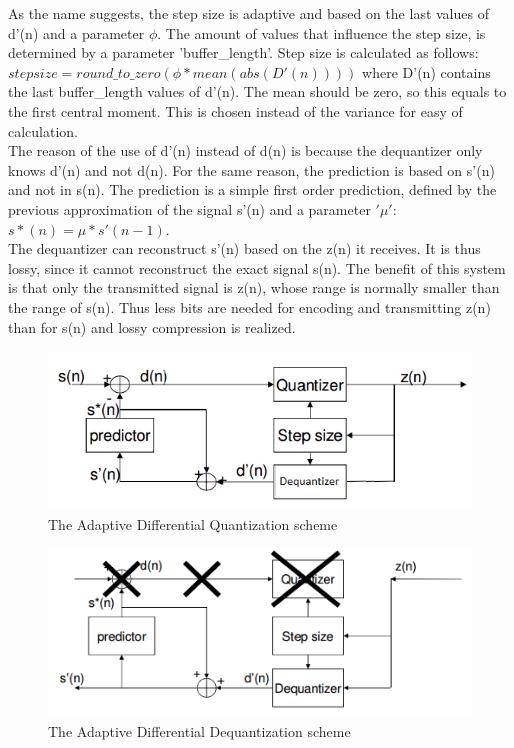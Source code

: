 \documentclass[a4paper]{article}
\begin{document}
As the name suggests, the step size is adaptive and based on the last values of d'(n) and a parameter $\phi$. The amount of values that influence the step size, is determined by a parameter 'buffer\_length'. Step size is calculated as follows:\\
$stepsize = round\_to\_zero(\phi*mean(abs(D'(n))))$
where D'(n) contains the last buffer\_length values of d'(n). The mean should be zero, so this equals to the first central moment. This is chosen instead of the variance for easy of calculation. \\
The reason of the use of d'(n) instead of d(n) is because the dequantizer only knows d'(n) and not d(n). For the same reason, the prediction is based on s'(n) and not in s(n). The prediction is a simple first order prediction, defined by the previous approximation of the signal s'(n) and a parameter $'\mu'$:\\
$s*(n) = \mu*s'(n-1)$.\\
The dequantizer can reconstruct s'(n) based on the z(n) it receives. It is thus lossy, since it cannot reconstruct the exact signal s(n). The benefit of this system is that only the transmitted signal is z(n), whose range is normally smaller than the range of s(n). Thus less bits are needed for encoding and transmitting z(n) than for s(n) and lossy compression is realized.
\begin{figure}[hbt]
\includegraphics[width = \textwidth]{Quantization.png}
\caption{The Adaptive Differential Quantization scheme}
\label{fig:quantization}
\end{figure}
\begin{figure}[hbt]
\includegraphics[width = \textwidth]{Dequantization.png}
\caption{The Adaptive Differential Dequantization scheme}
\label{fig:dequantization}
\end{figure}
\end{document}
